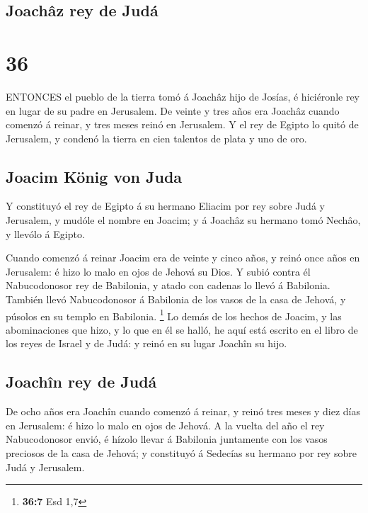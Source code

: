 \hypertarget{joachuxe2z-rey-de-juduxe1}{%
\subsection{Joachâz rey de Judá}\label{joachuxe2z-rey-de-juduxe1}}

\hypertarget{section-35}{%
\section{36}\label{section-35}}

 ENTONCES el pueblo de la tierra tomó á Joachâz hijo de
Josías, é hiciéronle rey en lugar de su padre en Jerusalem. 
De veinte y tres años era Joachâz cuando comenzó á reinar, y tres meses
reinó en Jerusalem.  Y el rey de Egipto lo quitó de
Jerusalem, y condenó la tierra en cien talentos de plata y uno de oro.

\hypertarget{joacim-kuxf6nig-von-juda}{%
\subsection{Joacim König von Juda}\label{joacim-kuxf6nig-von-juda}}

 Y constituyó el rey de Egipto á su hermano Eliacim por rey
sobre Judá y Jerusalem, y mudóle el nombre en Joacim; y á Joachâz su
hermano tomó Nechâo, y llevólo á Egipto.

 Cuando comenzó á reinar Joacim era de veinte y cinco años,
y reinó once años en Jerusalem: é hizo lo malo en ojos de Jehová su
Dios.  Y subió contra él Nabucodonosor rey de Babilonia, y
atado con cadenas lo llevó á Babilonia.  También llevó
Nabucodonosor á Babilonia de los vasos de la casa de Jehová, y púsolos
en su templo en Babilonia. \footnote{\textbf{36:7} Esd 1,7} 
Lo demás de los hechos de Joacim, y las abominaciones que hizo, y lo que
en él se halló, he aquí está escrito en el libro de los reyes de Israel
y de Judá: y reinó en su lugar Joachîn su hijo.

\hypertarget{joachuxeen-rey-de-juduxe1}{%
\subsection{Joachîn rey de Judá}\label{joachuxeen-rey-de-juduxe1}}

 De ocho años era Joachîn cuando comenzó á reinar, y reinó
tres meses y diez días en Jerusalem: é hizo lo malo en ojos de Jehová.
 A la vuelta del año el rey Nabucodonosor envió, é hízolo
llevar á Babilonia juntamente con los vasos preciosos de la casa de
Jehová; y constituyó á Sedecías su hermano por rey sobre Judá y
Jerusalem.

